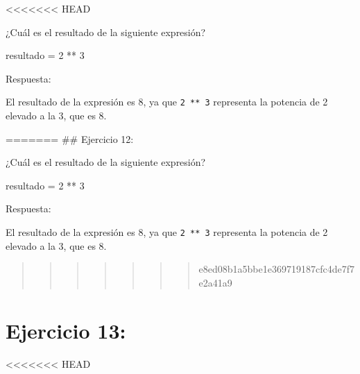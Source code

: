 \documentclass[
  a4paper,
  onepage,
  openany]{scrreprt}
\newenvironment{Shaded}{\begin{snugshade}}{\end{snugshade}}
\newcommand{\DecValTok}[1]{\textcolor[rgb]{0.68,0.00,0.00}{#1}}
\newcommand{\NormalTok}[1]{\textcolor[rgb]{0.00,0.23,0.31}{#1}}
\newcommand{\OperatorTok}[1]{\textcolor[rgb]{0.37,0.37,0.37}{#1}}
\begin{document}
\textless\textless\textless\textless\textless\textless\textless{} HEAD

¿Cuál es el resultado de la siguiente expresión?

\begin{Shaded}
\begin{Highlighting}[]
\NormalTok{resultado }\OperatorTok{=} \DecValTok{2} \OperatorTok{**} \DecValTok{3}
\end{Highlighting}
\end{Shaded}

Respuesta:

El resultado de la expresión es 8, ya que \texttt{2\ **\ 3} representa
la potencia de 2 elevado a la 3, que es 8.

======= \#\# Ejercicio 12:

¿Cuál es el resultado de la siguiente expresión?

\begin{Shaded}
\begin{Highlighting}[]
\NormalTok{resultado }\OperatorTok{=} \DecValTok{2} \OperatorTok{**} \DecValTok{3}
\end{Highlighting}
\end{Shaded}

Respuesta:

El resultado de la expresión es 8, ya que \texttt{2\ **\ 3} representa
la potencia de 2 elevado a la 3, que es 8.

\begin{quote}
\begin{quote}
\begin{quote}
\begin{quote}
\begin{quote}
\begin{quote}
\begin{quote}
e8ed08b1a5bbe1e369719187cfc4de7f7e2a41a9
\end{quote}
\end{quote}
\end{quote}
\end{quote}
\end{quote}
\end{quote}
\end{quote}

\hypertarget{ejercicio-13}{%
\chapter{Ejercicio 13:}\label{ejercicio-13}}

\textless\textless\textless\textless\textless\textless\textless{} HEAD
\end{document}
